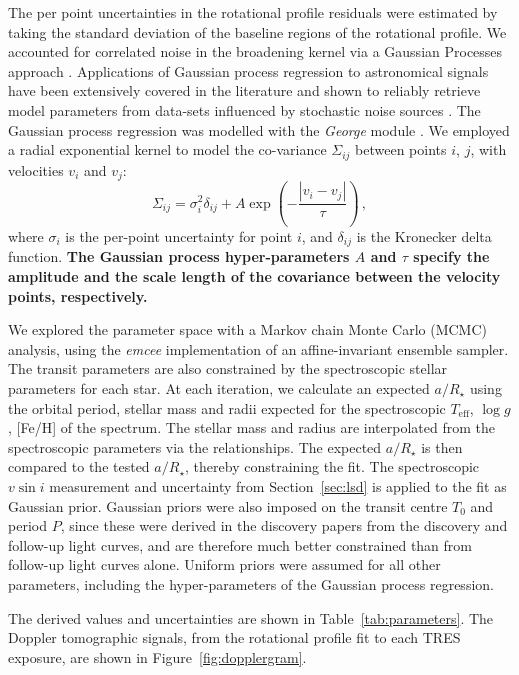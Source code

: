 \documentclass[useAMS,usenatbib]{mn2e}
\begin{document}
The per point uncertainties in the rotational profile residuals were estimated by taking the standard deviation of the baseline regions of the rotational profile. We accounted for correlated noise in the broadening kernel via a Gaussian Processes approach \citep[e.g.][]{2015AJ....150..197H}. Applications of Gaussian process regression to astronomical signals have been extensively covered in the literature and shown to reliably retrieve model parameters from data-sets influenced by stochastic noise sources \citep[e.g.][]{2012MNRAS.419.2683G,2014MNRAS.445.3401G}. The Gaussian process regression was modelled with the \emph{George} module \citep{2014arXiv1403.6015A}. We employed a radial exponential kernel to model the co-variance $\Sigma_{ij}$ between points $i$, $j$, with velocities $v_{i}$ and $v_{j}$:
\begin{equation}
  \Sigma_{ij} = \sigma_{i}^2 \delta_{ij} + A \exp \left(- \frac{|v_{i}-v_{j}|}{\tau} \right)\,,
\end{equation}
where $\sigma_{i}$ is the per-point uncertainty for point $i$, and $\delta_{ij}$ is the Kronecker delta function. \textbf{The Gaussian process hyper-parameters $A$ and $\tau$ specify the amplitude and the scale length of the covariance between the velocity points, respectively.}


We explored the parameter space with a Markov chain Monte Carlo (MCMC) analysis, using the \emph{emcee} implementation \citep{2013PASP..125..306F} of an affine-invariant ensemble sampler. The transit parameters are also constrained by the spectroscopic stellar parameters for each star. At each iteration, we calculate an expected $a/R_\star$ using the orbital period, stellar mass and radii expected for the spectroscopic $T_\text{eff}$, $\log g$, [Fe/H] of the spectrum. The stellar mass and radius are interpolated from the spectroscopic parameters via the \citet{2010A&amp;ARv..18...67T} relationships. The expected $a/R_\star$ is then compared to the tested $a/R_\star$, thereby constraining the fit. The spectroscopic $v \sin i$ measurement and uncertainty from Section~\ref{sec:lsd} is applied to the fit as Gaussian prior. Gaussian priors were also imposed on the transit centre $T_0$ and period $P$, since these were derived in the discovery papers from the discovery and follow-up light curves, and are therefore much better constrained than from follow-up light curves alone. Uniform priors were assumed for all other parameters, including the hyper-parameters of the Gaussian process regression. 

The derived values and uncertainties are shown in Table~\ref{tab:parameters}. The Doppler tomographic signals, from the rotational profile fit to each TRES exposure, are shown in Figure~\ref{fig:dopplergram}. 
\end{document}
